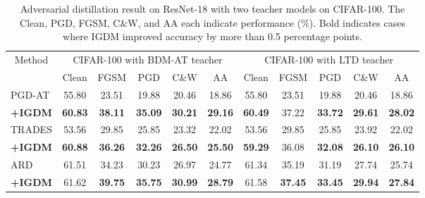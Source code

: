 \documentclass{article} %
\begin{document}
\begin{table}[h]
 \centering
 \caption{Adversarial distillation result on ResNet-18 with two teacher models on CIFAR-100. The Clean, PGD, FGSM, C\&W, and AA each indicate performance (\%). Bold indicates cases where IGDM improved accuracy by more than 0.5 percentage points.}
 \setlength{\tabcolsep}{5.5pt}
 \begin{tabular}{lcccccccccc}
 \toprule
    \multicolumn{1}{c}{\multirow{2.5}{*}{Method}}  & \multicolumn{5}{c}{ CIFAR-100 with BDM-AT teacher}& \multicolumn{5}{c}{CIFAR-100 with LTD teacher} \\
   \cmidrule(r){2-6}
   \cmidrule(r){7-11}
   & Clean & FGSM & PGD & C\&W & AA & Clean & FGSM & PGD & C\&W & AA \\
\midrule

 PGD-AT  & 55.80 & 23.51 & 19.88 & 20.46 & 18.86 & 55.80 & 23.51 & 19.88 & 20.46 & 18.86  \\
 \textbf{+IGDM} & \textbf{60.83} & \textbf{38.11} & \textbf{35.09} & \textbf{30.21}& \textbf{29.16}& \textbf{60.49} & 37.22 & \textbf{33.72} & \textbf{29.61} & \textbf{28.02} \\
 \midrule
 TRADES & 53.56 & 29.85 & 25.85 & 23.32 & 22.02 & 53.56 & 29.85 & 25.85 & 23.92 & 22.02 \\
 \textbf{+IGDM}  & \textbf{60.88} & \textbf{36.26} & \textbf{32.26} & \textbf{26.50} & \textbf{25.50} & \textbf{59.29} & 36.08 & \textbf{32.08} & \textbf{26.10} & \textbf{26.10} \\
 \midrule
 ARD & 61.51 & 34.23 & 30.23 & 26.97 & 24.77& 61.34 & 35.19 & 31.19 & 27.74 & 25.74\\
 \textbf{+IGDM} & 61.62 & \textbf{39.75} & \textbf{35.75} & \textbf{30.99} & \textbf{28.79} & 61.58 & \textbf{37.45} & \textbf{33.45} & \textbf{29.94} & \textbf{27.84}\\
 \midrule


\end{tabular}
\end{table}
\end{document}
